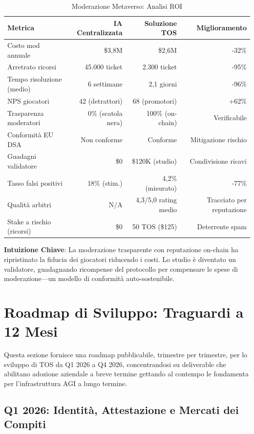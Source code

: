 \documentclass[11pt]{article}
\begin{document}
\begin{itemize}[noitemsep]
\begin{table}[H]
\centering
\caption{Moderazione Metaverso: Analisi ROI}
\label{tab:metaverse-roi}
\begin{tabular}{@{}lrrr@{}}
\toprule
\textbf{Metrica} & \textbf{IA Centralizzata} & \textbf{Soluzione TOS} & \textbf{Miglioramento} \\ \midrule
Costo mod annuale & \$3,8M & \$2,6M & -32\% \\
Arretrato ricorsi & 45.000 ticket & 2.300 ticket & -95\% \\
Tempo risoluzione (medio) & 6 settimane & 2,1 giorni & -96\% \\
NPS giocatori & 42 (detrattori) & 68 (promotori) & +62\% \\
Trasparenza moderatori & 0\% (scatola nera) & 100\% (on-chain) & Verificabile \\
Conformità EU DSA & Non conforme & Conforme & Mitigazione rischio \\
Guadagni validatore & \$0 & \$120K (studio) & Condivisione ricavi \\
Tasso falsi positivi & 18\% (stim.) & 4,2\% (misurato) & -77\% \\
Qualità arbitri & N/A & 4,3/5,0 rating medio & Tracciato per reputazione \\
Stake a rischio (ricorsi) & \$0 & 50 TOS (\$125) & Deterrente spam \\
\bottomrule
\end{tabular}
\end{table}

\textbf{Intuizione Chiave}: La moderazione trasparente con reputazione on-chain ha ripristinato la fiducia dei giocatori riducendo i costi. Lo studio è diventato un validatore, guadagnando ricompense del protocollo per compensare le spese di moderazione—un modello di conformità auto-sostenibile.

\section{Roadmap di Sviluppo: Traguardi a 12 Mesi}
\label{sec:12month-roadmap}

Questa sezione fornisce una roadmap pubblicabile, trimestre per trimestre, per lo sviluppo di TOS da Q1 2026 a Q4 2026, concentrandosi su deliverable che abilitano adozione aziendale a breve termine gettando al contempo le fondamenta per l'infrastruttura AGI a lungo termine.

\subsection{Q1 2026: Identità, Attestazione e Mercati dei Compiti}


\end{itemize}
\end{document}

